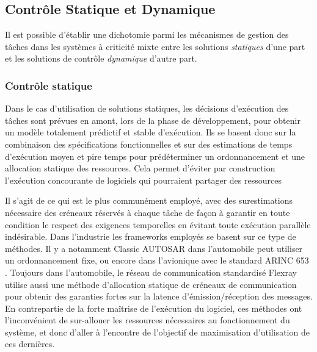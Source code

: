 \documentclass[french, a4paper, 11pt, twoside, pdftex]{StyleThese}
\begin{document}
	\subsection{Contrôle Statique et Dynamique}
	Il est possible d'établir une dichotomie parmi les mécanismes de gestion des tâches dans les systèmes à criticité mixte entre les solutions \textit{statiques} d'une part et les solutions de contrôle \textit{dynamique} d'autre part. 
	
	\subsubsection{Contrôle statique}
	Dans le cas d'utilisation de solutions statiques, les décisions d'exécution des tâches sont prévues en amont, lors de la phase de développement, pour obtenir un modèle totalement prédictif et stable d'exécution. Ils se basent donc sur la combinaison des spécifications fonctionnelles et sur des estimations de temps d'exécution moyen et pire temps pour prédéterminer un ordonnancement et une allocation statique des ressources. Cela permet d'éviter par construction l'exécution concourante de logiciels qui pourraient partager des ressources
	
	Il s'agit de ce qui est le plus communément employé, avec des surestimations nécessaire des créneaux réservés à chaque tâche de façon à garantir en toute condition le respect des exigences temporelles en évitant toute exécution parallèle indésirable. Dans l'industrie les frameworks employés se basent sur ce type de méthodes. Il y a notamment Classic AUTOSAR \cite{autosar_timing_2016} dans l'automobile peut utiliser un ordonnancement fixe, ou encore dans l'avionique avec le standard ARINC 653 \cite{prisaznuk_arinc_2008}. Toujours dans l'automobile, le réseau de communication standardisé Flexray~\cite{makowitz_flexray-communication_2006} utilise aussi une méthode d'allocation statique de créneaux de communication pour obtenir des garanties fortes sur la latence d'émission/réception des messages. En contrepartie de la forte maîtrise de l'exécution du logiciel, ces méthodes ont l'inconvénient de sur-allouer les ressources nécessaires au fonctionnement du système, et donc d'aller à l'encontre de l'objectif de maximisation d'utilisation de ces dernières.
	
\end{document}
